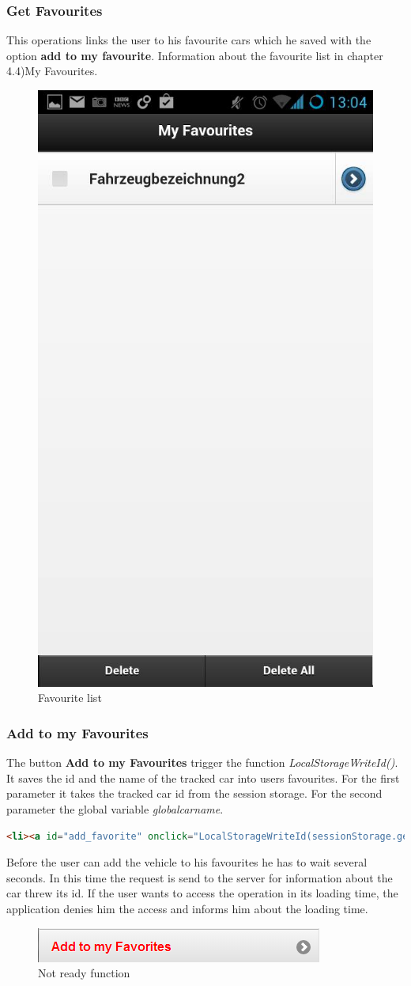 \subsubsection{Get Favourites}
This operations links the user to his favourite cars which he saved with the option \textbf{add to my favourite}. Information about the favourite list in chapter 4.4)My Favourites.
\\

\begin{figure}[h]
\centering
\includegraphics[width=0.
\linewidth]{graphics/chapter4/10}
\caption{Favourite list}
\label{fig:11}
\end{figure}
\newpage

\subsubsection{Add to my Favourites}
The button \textbf{Add to my Favourites} trigger the function \textit{LocalStorageWriteId()}. It saves the id and the name of the tracked car into users favourites. For the first parameter it takes the tracked car id from the session storage. For the second parameter the global variable \textit{globalcarname}.
\\

\begin{lstlisting}[language=html, caption= 
add favourite sorce code,captionpos=b]
<li><a id="add_favorite" onclick="LocalStorageWriteId(sessionStorage.getItem('id'),globalcarname);" style="color:red" rel="external" >Add to my Favorites</a></li>
\end{lstlisting}

Before the user can add the vehicle to his favourites he has to wait several seconds. In this time the request is send to the server for information about the car threw its id. If the user wants to access the operation in its loading time, the application denies him the access and informs him about the loading time.
\\

\begin{figure}[h]
\centering
\includegraphics[width=0.6\linewidth]{graphics/chapter4/11}
\caption{Not ready function}
\label{fig:12}
\end{figure}

